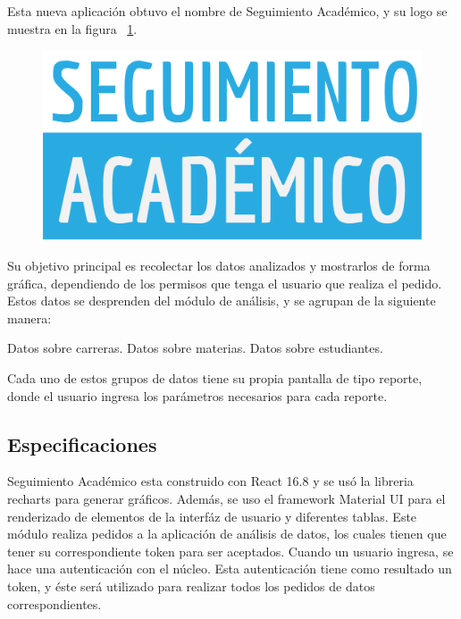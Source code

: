 Esta nueva aplicación obtuvo el nombre de Seguimiento Académico, y su logo se muestra en la figura ~\ref{fig:seguimiento-academico-logo}.

\begin{figure}[h!]
  \centering
    \includegraphics[scale=0.5]{images/seguimiento-academico/seguimiento-academico-blanco.png}
  \label{fig:seguimiento-academico-logo}
\end{figure}

Su objetivo principal es recolectar los datos analizados y mostrarlos de forma gráfica, dependiendo de los permisos que tenga el usuario que realiza el pedido.
Estos datos se desprenden del módulo de análisis, y se agrupan de la siguiente manera:

\begin{outline}
\2 Datos sobre carreras.
\2 Datos sobre materias.
\2 Datos sobre estudiantes.
\end{outline}

Cada uno de estos grupos de datos tiene su propia pantalla de tipo reporte, donde el usuario ingresa los parámetros necesarios para cada reporte.


\subsection{Especificaciones}

Seguimiento Académico esta construido con React 16.8 y se usó la libreria recharts para generar gráficos. Además, se uso el framework Material UI para el renderizado de elementos de la interfáz de usuario y diferentes tablas.
Este módulo realiza pedidos a la aplicación de análisis de datos, los cuales tienen que tener su correspondiente token para ser aceptados.
Cuando un usuario ingresa, se hace una autenticación con el núcleo. Esta autenticación tiene como resultado un token, y éste será utilizado para realizar todos los pedidos de datos correspondientes.

